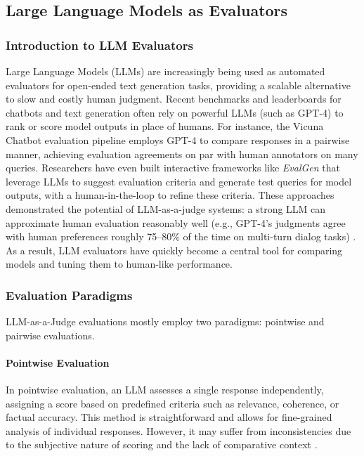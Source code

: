 \documentclass[sigconf, authoryear]{acmart}
\begin{document}
\subsection{Large Language Models as Evaluators}\label{subsec:large-language-models-as-evaluators}

\subsubsection{Introduction to LLM Evaluators}

Large Language Models (LLMs) are increasingly being used as automated evaluators for open-ended text generation tasks, providing a scalable alternative to slow and costly human judgment.
Recent benchmarks and leaderboards for chatbots and text generation often rely on powerful LLMs (such as GPT-4) to rank or score model outputs in place of humans.
For instance, the Vicuna Chatbot evaluation pipeline employs GPT-4 to compare responses in a pairwise manner, achieving evaluation agreements on par with human annotators on many queries.
Researchers have even built interactive frameworks like \textit{EvalGen} \cite{evalgen} that leverage LLMs to suggest evaluation criteria and generate test queries for model outputs, with a human-in-the-loop to refine these criteria.
These approaches demonstrated the potential of LLM-as-a-judge systems: a strong LLM can approximate human evaluation reasonably well (e.g., GPT-4’s judgments agree with human preferences roughly 75–80\% of the time on multi-turn dialog tasks) \cite{mtbench}.
As a result, LLM evaluators have quickly become a central tool for comparing models and tuning them to human-like performance.

\subsubsection{Evaluation Paradigms}


LLM-as-a-Judge evaluations mostly employ two paradigms: pointwise and pairwise evaluations.


\paragraph{Pointwise Evaluation}


In pointwise evaluation, an LLM assesses a single response independently, assigning a score based on predefined criteria such as relevance, coherence, or factual accuracy.
This method is straightforward and allows for fine-grained analysis of individual responses.
However, it may suffer from inconsistencies due to the subjective nature of scoring and the lack of comparative context \cite{evalgen}.
\end{document}
